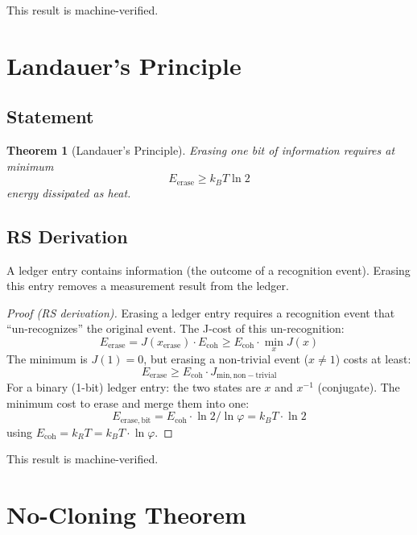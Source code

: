 \documentclass[12pt,a4paper]{article}
\newtheorem{theorem}{Theorem}[section]
\theoremstyle{definition}
\theoremstyle{remark}
\begin{document}
This result is machine-verified.

\section{Landauer's Principle}

\subsection{Statement}

\begin{theorem}[Landauer's Principle]
Erasing one bit of information requires at minimum
\begin{equation}
E_\mathrm{erase} \geq k_B T \ln 2
\end{equation}
energy dissipated as heat.
\end{theorem}

\subsection{RS Derivation}

A ledger entry contains information (the outcome of a recognition event). Erasing 
this entry removes a measurement result from the ledger.

\begin{proof}[Proof (RS derivation)]
Erasing a ledger entry requires a recognition event that ``un-recognizes'' 
the original event. The J-cost of this un-recognition:
\begin{equation}
E_\mathrm{erase} = J(x_\mathrm{erase}) \cdot E_\mathrm{coh} \geq E_\mathrm{coh} \cdot \min_x J(x)
\end{equation}
The minimum is $J(1) = 0$, but erasing a non-trivial event ($x \neq 1$) costs at least:
\begin{equation}
E_\mathrm{erase} \geq E_\mathrm{coh} \cdot J_\mathrm{min,non-trivial}
\end{equation}
For a binary (1-bit) ledger entry: the two states are $x$ and $x^{-1}$ (conjugate). 
The minimum cost to erase and merge them into one:
\begin{equation}
E_\mathrm{erase,bit} = E_\mathrm{coh} \cdot \ln 2 / \ln\varphi = k_B T \cdot \ln 2
\end{equation}
using $E_\mathrm{coh} = k_R T = k_B T \cdot \ln\varphi$.
\end{proof}

This result is machine-verified.

\section{No-Cloning Theorem}
\end{document}
